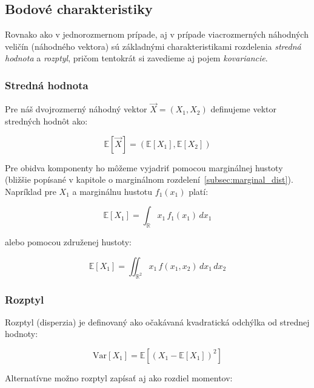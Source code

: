 \subsection{Bodové charakteristiky}\label{joint_moments}

Rovnako ako v jednorozmernom prípade, aj v prípade viacrozmerných náhodných veličín (náhodného vektora) sú základnými charakteristikami rozdelenia \textit{stredná hodnota} a \textit{rozptyl}, pričom tentokrát si zavedieme aj pojem \textit{kovariancie}.

\subsubsection{Stredná hodnota}\label{subsubsec:joint_mean}

Pre náš dvojrozmerný náhodný vektor \(\vec{X} = (X_1, X_2)\) definujeme vektor stredných hodnôt ako:

\begin{equation}
\mathbb{E}[\vec{X}] = \left( \mathbb{E}[X_1], \mathbb{E}[X_2] \right)
\end{equation}

Pre obidva komponenty ho môžeme vyjadriť pomocou marginálnej hustoty (bližšie popísané v kapitole o marginálnom rozdelení~\ref{subsec:marginal_dist}). Napríklad pre \(X_1\) a marginálnu hustotu \(f_1(x_1)\) platí:

\begin{equation}
\mathbb{E}[X_1] = \int_{\mathbb{R}} x_1 \, f_1(x_1) \, dx_1
\end{equation}

alebo pomocou združenej hustoty:

\begin{equation}
\mathbb{E}[X_1] = \iint_{\mathbb{R}^2} x_1 \, f(x_1, x_2) \, dx_1 \, dx_2
\end{equation}

\subsubsection{Rozptyl}\label{subsubsec:joint_variance}

Rozptyl (disperzia) je definovaný ako očakávaná kvadratická odchýlka od strednej hodnoty:

\begin{equation}
\mathrm{Var}[X_1] = \mathbb{E}[(X_1 - \mathbb{E}[X_1])^2]
\end{equation}

Alternatívne možno rozptyl zapísať aj ako rozdiel momentov:

